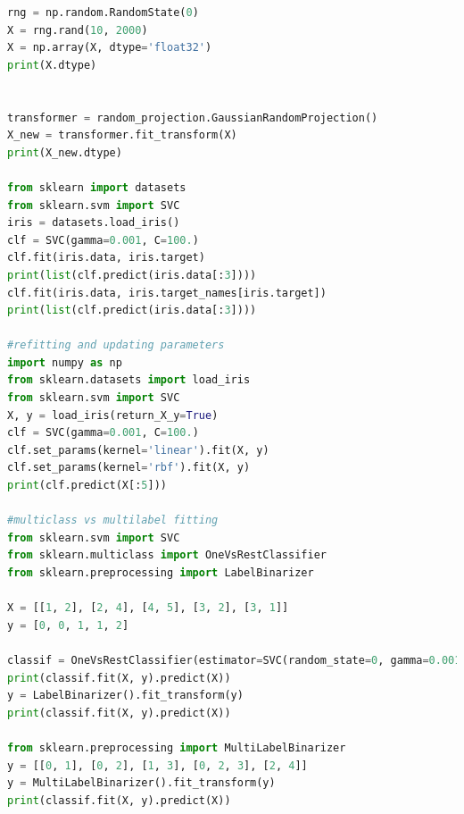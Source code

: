 \begin{enumerate}
\begin{lstlisting}[language=Python]
rng = np.random.RandomState(0)
X = rng.rand(10, 2000)
X = np.array(X, dtype='float32')
print(X.dtype)


transformer = random_projection.GaussianRandomProjection()
X_new = transformer.fit_transform(X)
print(X_new.dtype)

from sklearn import datasets
from sklearn.svm import SVC
iris = datasets.load_iris()
clf = SVC(gamma=0.001, C=100.)
clf.fit(iris.data, iris.target)
print(list(clf.predict(iris.data[:3])))
clf.fit(iris.data, iris.target_names[iris.target])
print(list(clf.predict(iris.data[:3])))

#refitting and updating parameters
import numpy as np
from sklearn.datasets import load_iris
from sklearn.svm import SVC
X, y = load_iris(return_X_y=True)
clf = SVC(gamma=0.001, C=100.)
clf.set_params(kernel='linear').fit(X, y)
clf.set_params(kernel='rbf').fit(X, y)
print(clf.predict(X[:5]))

#multiclass vs multilabel fitting
from sklearn.svm import SVC
from sklearn.multiclass import OneVsRestClassifier
from sklearn.preprocessing import LabelBinarizer

X = [[1, 2], [2, 4], [4, 5], [3, 2], [3, 1]]
y = [0, 0, 1, 1, 2]

classif = OneVsRestClassifier(estimator=SVC(random_state=0, gamma=0.001, C=100.))
print(classif.fit(X, y).predict(X))
y = LabelBinarizer().fit_transform(y)
print(classif.fit(X, y).predict(X))

from sklearn.preprocessing import MultiLabelBinarizer
y = [[0, 1], [0, 2], [1, 3], [0, 2, 3], [2, 4]]
y = MultiLabelBinarizer().fit_transform(y)
print(classif.fit(X, y).predict(X))

\end{lstlisting}
\end{enumerate}



